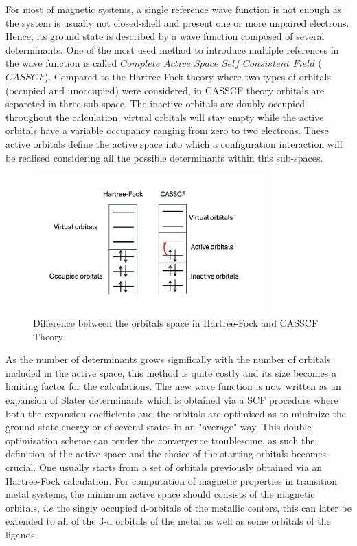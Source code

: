 \documentclass[10pt]{report}
\numberwithin{equation}{section}
\begin{document}
For most of magnetic systems, a single reference wave function is not enough as the system is usually not closed-shell and present one or more unpaired electrons.
Hence, its ground state is described by a wave function composed of several determinants.
One of the most used method to introduce multiple references in the wave function is called $Complete$ $Active$ $Space$ $Self$ $Consistent$ $Field$ ($CASSCF$). 
Compared to the Hartree-Fock theory where two types of orbitals (occupied and unoccupied) were considered, in CASSCF theory orbitals are separeted in three sub-space. The inactive orbitals are doubly occupied throughout the calculation, virtual orbitals will stay empty while the active orbitals have a variable occupancy ranging from zero to two electrons.
These active orbitals define the active space into which a configuration interaction will be realised considering all the possible determinants within this sub-spaces. 
\begin{figure}
    \centering
    \includegraphics[width=0.8\textwidth]{Images/EspaceCAS.png}
    \caption{Difference between the orbitals space in Hartree-Fock and CASSCF Theory}
    \label{CAS}
\end{figure}
As the number of determinants grows significally with the number of orbitals included in the active space, this method is quite costly and its size becomes a limiting factor for the calculations.
The new wave function is now written as an expansion of Slater determinants which is obtained via a SCF procedure where both the expansion coefficients and the orbitals are optimised as to minimize the ground state energy or of several states in an "average" way. 
This double optimisation scheme can render the convergence troublesome, as such the definition of the active space and the choice of the starting orbitals becomes crucial. One usually starts from a set of orbitals previously obtained via an Hartree-Fock calculation.
For computation of magnetic properties in transition metal systems, the minimum active space should consists of the magnetic orbitals, $i.e$ the singly occupied d-orbitals of the metallic centers, this can later be extended to all of the 3-d orbitals of the metal as well as some orbitals of the ligands.
\end{document}
